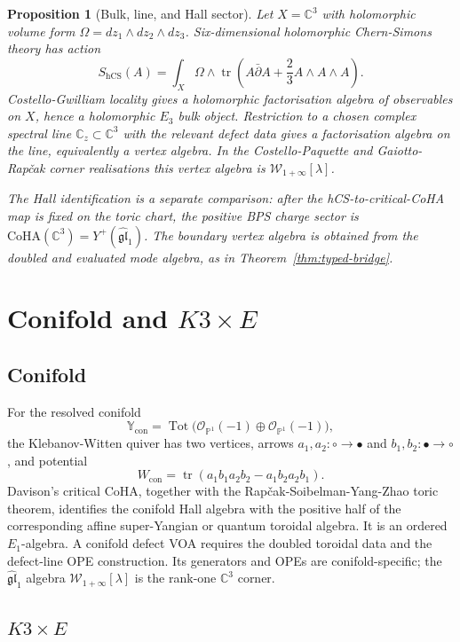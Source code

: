 \documentclass[11pt]{article}
\newtheorem{proposition}[theorem]{Proposition}
\providecommand{\CoHA}{\mathrm{CoHA}}
\providecommand{\gglone}{\widehat{\mathfrak{gl}}_{1}}
\providecommand{\Yp}{Y^{+}}
\providecommand{\Wilpha}{\mathcal{W}_{1+\infty}}
\providecommand{\hCS}{\mathrm{hCS}}
\providecommand{\Eone}{E_1}
\begin{document}
\begin{proposition}[Bulk, line, and Hall sector]
\label{prop:hcs-reading}
Let $X=\mathbb{C}^3$ with holomorphic volume form
$\Omega=dz_1\wedge dz_2\wedge dz_3$. Six-dimensional holomorphic
Chern-Simons theory has action
\[
S_{\hCS}(A)
=\int_X\Omega\wedge
\operatorname{tr}\left(A\bar{\partial}A+\frac{2}{3}A\wedge A\wedge A\right).
\]
Costello-Gwilliam locality gives a holomorphic factorisation algebra of
observables on $X$, hence a holomorphic $E_3$ bulk object. Restriction
to a chosen complex spectral line $\mathbb{C}_z\subset\mathbb{C}^3$
with the relevant defect data gives a factorisation algebra on the
line, equivalently a vertex algebra. In the Costello-Paquette and
Gaiotto-Rap\v{c}ak corner realisations this vertex algebra is
$\Wilpha[\lambda]$.

The Hall identification is a separate comparison: after the
hCS-to-critical-CoHA map is fixed on the toric chart, the positive BPS
charge sector is $\CoHA(\mathbb{C}^3)=\Yp(\gglone)$. The boundary
vertex algebra is obtained from the doubled and evaluated mode algebra,
as in Theorem~\ref{thm:typed-bridge}.
\end{proposition}

\section{Conifold and $K3\times E$}

\subsection{Conifold}

For the resolved conifold
\[
\mathbb{Y}_{\mathrm{con}}
=\operatorname{Tot}\bigl(\mathcal{O}_{\mathbb{P}^1}(-1)\oplus
\mathcal{O}_{\mathbb{P}^1}(-1)\bigr),
\]
the Klebanov-Witten quiver has two vertices, arrows
$a_1,a_2:\circ\to\bullet$ and $b_1,b_2:\bullet\to\circ$, and potential
\[
W_{\mathrm{con}}
=\operatorname{tr}(a_1b_1a_2b_2-a_1b_2a_2b_1).
\]
Davison's critical CoHA, together with the
Rap\v{c}ak-Soibelman-Yang-Zhao toric theorem, identifies the conifold
Hall algebra with the positive half of the corresponding affine
super-Yangian or quantum toroidal algebra. It is an ordered
$\Eone$-algebra. A conifold defect VOA requires the doubled toroidal
data and the defect-line OPE construction. Its generators and OPEs are
conifold-specific; the $\gglone$ algebra $\Wilpha[\lambda]$ is the
rank-one $\mathbb{C}^3$ corner.

\subsection{$K3\times E$}
\end{document}
